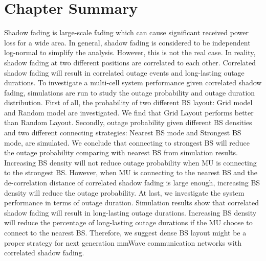  \section{Chapter Summary}
 \label{4:Conclusion}
 Shadow fading is large-scale fading which can cause significant received power loss for a wide area. In general, shadow fading is considered to be independent log-normal to simplify the analysis. However, this is not the real case. In reality, shadow fading at two different positions are correlated to each other. Correlated shadow fading will result in correlated outage events and long-lasting outage durations. To investigate a multi-cell system performance given correlated shadow fading, simulations are run to study the outage probability and outage duration distribution. First of all, the probability of two different BS layout: Grid model and Random model are investigated. We find that Grid Layout performs better than Random Layout. Secondly, outage probability given different BS densities and two different connecting strategies: Nearest BS mode and Strongest BS mode, are simulated. We conclude that connecting to strongest BS will reduce the outage probability comparing with nearest BS from simulation results. Increasing BS density will not reduce outage probability when MU is connecting to the strongest BS. However, when MU is connecting to the nearest BS and the de-correlation distance of correlated shadow fading is large enough, increasing BS density will reduce the outage probability.  At last, we investigate the system performance in terms of outage duration. Simulation results show that correlated shadow fading will result in long-lasting outage durations. Increasing BS density will reduce the percentage of long-lasting outage durations if the MU choose to connect to the nearest BS. Therefore, we suggest dense BS layout might be a proper strategy for next generation mmWave communication networks with correlated shadow fading.
 

